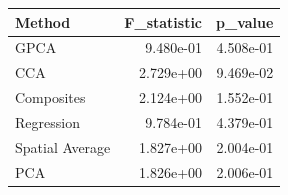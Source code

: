 \begin{tabular}{lrr}
\toprule
Method & F_statistic & p_value \\
\midrule
GPCA & 9.480e-01 & 4.508e-01 \\
CCA & 2.729e+00 & 9.469e-02 \\
Composites & 2.124e+00 & 1.552e-01 \\
Regression & 9.784e-01 & 4.379e-01 \\
Spatial Average & 1.827e+00 & 2.004e-01 \\
PCA & 1.826e+00 & 2.006e-01 \\
\bottomrule
\end{tabular}
